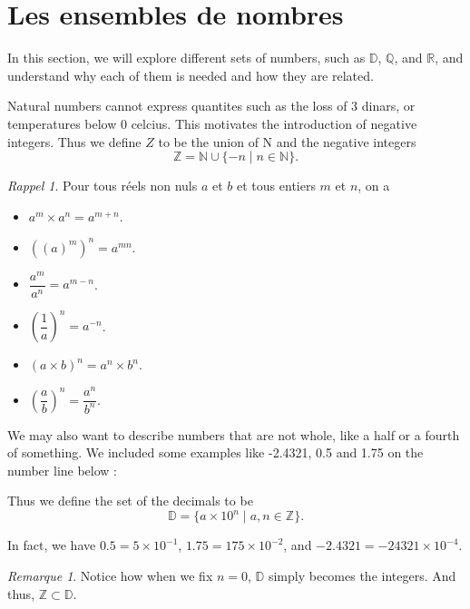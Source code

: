 \documentclass[12pt,a4paper]{article}
\theoremstyle{plain}
\theoremstyle{definition}
\theoremstyle{remark}
\newtheorem*{remark}{Remarque}
\newtheorem*{recall}{Rappel}
\begin{document}
\newpage
\section{Les ensembles de nombres}

In this section, we will explore different sets of numbers, such as $\mathbb{D}$, 
$\mathbb{Q}$, and $\mathbb{R}$, and understand why each of them is needed and how
they are related.

Natural numbers cannot express quantites such as the loss of 3 dinars, or 
temperatures below 0 celcius. This motivates the introduction of negative
integers. Thus we define $Z$ to be the union of N and the negative integers 
\[
  \mathbb{Z} = \mathbb{N} \cup \{-n \mid n \in \mathbb{N}\}.
\]

\begin{recall}
Pour tous réels non nuls \(a\) et \(b\) et tous entiers \(m\) et \(n\), on a
\begin{itemize}
  \item \(a^m \times a^n = a^{m+n}\).
  \item \(((a)^m)^n = a^{mn}\).
  \item \(\dfrac{a^m}{a^n} = a^{m-n}\).
  \item \(\left(\dfrac{1}{a}\right)^n = a^{-n}\).
  \item \((a \times b)^n = a^n \times b^n\).
  \item \(\left(\dfrac{a}{b}\right)^n = \dfrac{a^n}{b^n}\).
\end{itemize}
\end{recall}

We may also want to describe numbers that are not whole, like a half or a fourth
of something. We included some examples like -2.4321, 0.5 and 1.75 on the number
line below :

\begin{figure}[htbp]
    \centering
    
\end{figure}

Thus we define the set of the decimals to be
\[
  \mathbb{D} = \{a \times 10^n \mid a, n \in \mathbb{Z}\}.
\]

In fact, we have $0.5 = 5 \times 10^{-1}$, $1.75 = 175 \times 10^{-2}$, and 
$-2.4321 = -24321 \times 10^{-4}$.

\begin{remark}
  Notice how when we fix $n = 0$, $\mathbb{D}$ simply becomes the integers. And thus,
  $\mathbb{Z} \subset \mathbb{D}$.
\end{remark}
\end{document}
